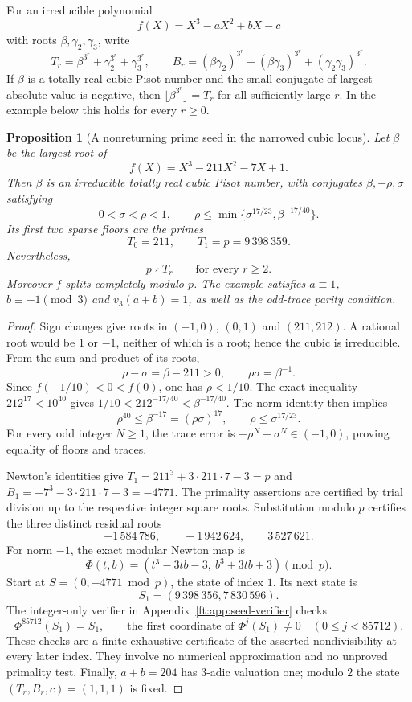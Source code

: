 \documentclass[11pt,a4paper]{article}
\newtheorem{proposition}[theorem]{Proposition}
\theoremstyle{definition}
\theoremstyle{remark}
\numberwithin{equation}{section}
\begin{document}
For an irreducible polynomial
\[
 f(X)=X^3-aX^2+bX-c
\]
with roots $\beta,\gamma_2,\gamma_3$, write
\[
 T_r=\beta^{3^r}+\gamma_2^{3^r}+\gamma_3^{3^r},\qquad
 B_r=(\beta\gamma_2)^{3^r}+(\beta\gamma_3)^{3^r}
       +(\gamma_2\gamma_3)^{3^r}.
\]
If $\beta$ is a totally real cubic Pisot number and the small conjugate
of largest absolute value is negative, then
$\lfloor\beta^{3^r}\rfloor=T_r$ for all sufficiently large $r$.
In the example below this holds for every $r\ge0$.

\begin{proposition}[A nonreturning prime seed in the narrowed cubic locus]
\label{ft:prop:seed-nonreturn}
Let $\beta$ be the largest root of
\[
 f(X)=X^3-211X^2-7X+1.
\]
Then $\beta$ is an irreducible totally real cubic Pisot number, with
conjugates $\beta,-\rho,\sigma$ satisfying
\[
 0<\sigma<\rho<1,
 \qquad \rho\le\min\{\sigma^{17/23},\beta^{-17/40}\}.
\]
Its first two sparse floors are the primes
\[
 T_0=211,\qquad T_1=p=9\,398\,359.
\]
Nevertheless,
\[
 p\nmid T_r\qquad\text{for every }r\ge2.
\]
Moreover $f$ splits completely modulo $p$.  The example satisfies
$a\equiv1$, $b\equiv-1\pmod3$ and $v_3(a+b)=1$, as well as the
odd-trace parity condition.
\end{proposition}
\begin{proof}
Sign changes give roots in $(-1,0)$, $(0,1)$ and $(211,212)$.
A rational root would be $1$ or $-1$, neither of which is a root;
hence the cubic is irreducible.  From the sum and product of its roots,
\[
 \rho-\sigma=\beta-211>0,\qquad \rho\sigma=\beta^{-1}.
\]
Since $f(-1/10)<0<f(0)$, one has $\rho<1/10$.  The exact inequality
$212^{17}<10^{40}$ gives
$1/10<212^{-17/40}<\beta^{-17/40}$.
The norm identity then implies
\[
 \rho^{40}\le\beta^{-17}=(\rho\sigma)^{17},
 \qquad \rho\le\sigma^{17/23}.
\]
For every odd integer $N\ge1$, the trace error is
$-\rho^N+\sigma^N\in(-1,0)$, proving equality of floors and traces.

Newton's identities give $T_1=211^3+3\cdot211\cdot7-3=p$ and
$B_1=-7^3-3\cdot211\cdot7+3=-4771$.
The primality assertions are certified by trial division up to the
respective integer square roots.  Substitution modulo $p$ certifies
the three distinct residual roots
\[
 -1\,584\,786,\qquad -1\,942\,624,\qquad 3\,527\,621.
\]
For norm $-1$, the exact modular Newton map is
\[
 \Phi(t,b)=
 (t^3-3tb-3,\ b^3+3tb+3)\pmod p.
\]
Start at $S=(0,-4771\bmod p)$, the state of index $1$.
Its next state is
\[
 S_1=(9\,398\,356,7\,830\,596).
\]
The integer-only verifier in Appendix~\ref{ft:app:seed-verifier} checks
\[
 \Phi^{85712}(S_1)=S_1,
 \qquad
 \text{the first coordinate of }\Phi^j(S_1)\ne0
 \quad(0\le j<85712).
\]
These checks are a finite exhaustive certificate of the asserted
nondivisibility at every later index.  They involve no numerical
approximation and no unproved primality test.
Finally, $a+b=204$ has $3$-adic valuation one; modulo $2$ the state
$(T_r,B_r,c)=(1,1,1)$ is fixed.
\end{proof}
\end{document}
